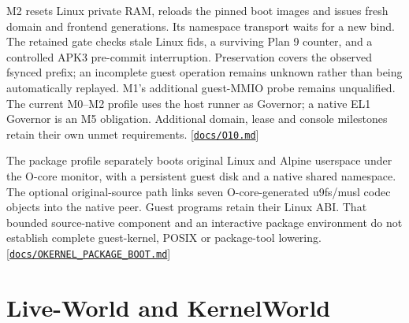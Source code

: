 \documentclass[11pt,oneside]{article}
\newcommand{\src}[1]{\textcolor{OSlate}{\scriptsize[\href{https://github.com/lostadi/OSTADIX/blob/c0b02c326b2329a95ba52447c7180bc93957cd57/#1}{\nolinkurl{#1}}]}\allowbreak}
\begin{document}
M2 resets Linux private RAM, reloads the pinned boot images and issues fresh
domain and frontend generations. Its namespace transport waits for a new
bind. The retained gate checks stale Linux fids, a surviving Plan 9 counter,
and a controlled APK3 pre-commit interruption. Preservation covers the
observed fsynced prefix; an incomplete guest operation remains unknown
rather than being automatically replayed. M1's additional guest-MMIO probe
remains unqualified. The current M0--M2 profile uses the host runner as
Governor; a native EL1 Governor is an M5 obligation. Additional domain,
lease and console milestones retain their own unmet requirements.
\src{docs/O10.md}

The package profile separately boots original Linux and Alpine userspace
under the O-core monitor, with a persistent guest disk and a native shared
namespace. The optional original-source path links seven O-core-generated
u9fs/musl codec objects into the native peer. Guest programs retain their
Linux ABI. That bounded source-native component and an interactive package
environment do not establish complete guest-kernel, POSIX or package-tool
lowering.
\src{docs/OKERNEL_PACKAGE_BOOT.md}

\clearpage
\section{Live-World and KernelWorld}
\label{sec:world}
\end{document}
